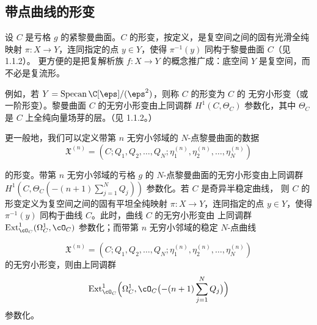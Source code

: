 
\subsection{带点曲线的形变}

设 $C$ 是亏格 $g$ 的紧黎曼曲面。$C$ 的形变，按定义，是复空间之间的固有光滑全纯映射
$\pi:X\to Y$，连同指定的点 $y\in Y$，使得 $\pi^{-1}(y)$ 同构于黎曼曲面 $C$（见 1.1.2）。
更方便的是把复解析族 $f:X\to Y$ 的概念推广成：底空间 $Y$ 是复空间，而不必是复流形。

例如，若 $Y=\operatorname{Specan}\C[\eps]/(\eps^2)$，则称 $C$ 的形变为 $C$ 的
无穷小形变（或一阶形变）。黎曼曲面 $C$ 的无穷小形变由上同调群
$H^1(C,\Theta_C)$ 参数化，其中 $\Theta_C$ 是 $C$ 上全纯向量场芽的层。（见 1.1.2。）

更一般地，我们可以定义带第 $n$ 无穷小邻域的 $N$-点黎曼曲面的数据
\[
\mathfrak{X}^{(n)}
=(C;Q_1,Q_2,\dots,Q_N;\eta_1^{(n)},\eta_2^{(n)},\dots,\eta_N^{(n)})
\]
\begin{sloppypar}的形变。带第 $n$ 无穷小邻域的亏格 $g$ 的 $N$-点黎曼曲面的无穷小形变由上同调群
$H^1(C,\Theta_C(-(n+1)\sum_{j=1}^N Q_j))$ 参数化。若 $C$ 是奇异半稳定曲线，
则 $C$ 的形变定义为复空间之间的固有平坦全纯映射 $\pi:X\to Y$，连同指定的点
$y\in Y$，使得 $\pi^{-1}(y)$ 同构于曲线 $C$。此时，曲线 $C$ 的无穷小形变由
上同调群 $\operatorname{Ext}^1_{\cO_C}(\Omega^1_C,\cO_C)$ 参数化；而带第 $n$
无穷小邻域的稳定 $N$-点曲线
\end{sloppypar}
\[
\mathfrak{X}^{(n)}
=(C;Q_1,Q_2,\dots,Q_N;\eta_1^{(n)},\eta_2^{(n)},\dots,\eta_N^{(n)})
\]
的无穷小形变，则由上同调群
\[
\operatorname{Ext}^1_{\cO_C}
\Bigl(\Omega^1_C,\cO_C\bigl(-(n+1)\sum_{j=1}^N Q_j\bigr)\Bigr)
\]
参数化。

